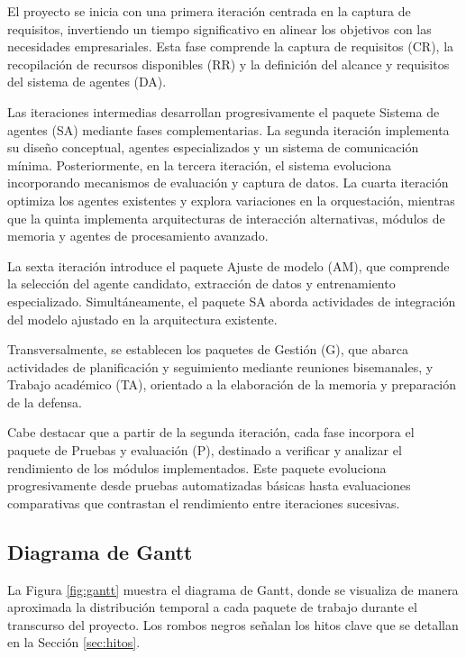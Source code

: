 El proyecto se inicia con una primera iteración centrada en la captura de requisitos, invertiendo un tiempo significativo en alinear los objetivos con las necesidades empresariales. Esta fase comprende la captura de requisitos (CR), la recopilación de recursos disponibles (RR) y la definición del alcance y requisitos del sistema de agentes (DA).

Las iteraciones intermedias desarrollan progresivamente el paquete Sistema de agentes (SA) mediante fases complementarias. La segunda iteración implementa su diseño conceptual, agentes especializados y un sistema de comunicación mínima. Posteriormente, en la tercera iteración, el sistema evoluciona incorporando mecanismos de evaluación y captura de datos. La cuarta iteración optimiza los agentes existentes y explora variaciones en la orquestación, mientras que la quinta implementa arquitecturas de interacción alternativas, módulos de memoria y agentes de procesamiento avanzado.

La sexta iteración introduce el paquete Ajuste de modelo (AM), que comprende la selección del agente candidato, extracción de datos y entrenamiento especializado. Simultáneamente, el paquete SA aborda actividades de integración del modelo ajustado en la arquitectura existente.

Transversalmente, se establecen los paquetes de Gestión (G), que abarca actividades de planificación y seguimiento mediante reuniones bisemanales, y Trabajo académico (TA), orientado a la elaboración de la memoria y preparación de la defensa.

Cabe destacar que a partir de la segunda iteración, cada fase incorpora el paquete de Pruebas y evaluación (P), destinado a verificar y analizar el rendimiento de los módulos implementados. Este paquete evoluciona progresivamente desde pruebas automatizadas básicas hasta evaluaciones comparativas que contrastan el rendimiento entre iteraciones sucesivas.

\subsection{Diagrama de Gantt}

La Figura \ref{fig:gantt} muestra el diagrama de Gantt, donde se visualiza de manera aproximada la distribución temporal a cada paquete de trabajo durante el transcurso del proyecto. Los rombos negros señalan los hitos clave que se detallan en la Sección \ref{sec:hitos}.


